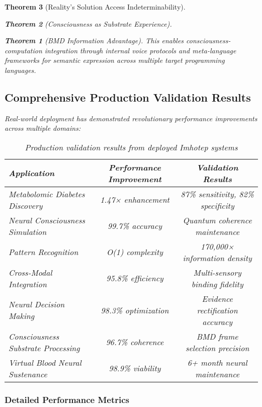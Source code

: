 \documentclass[12pt,a4paper]{article}
\newtheorem{theorem}{Theorem}[section]
\theoremstyle{remark}
\begin{document}
\begin{theorem}[Reality's Solution Access Indeterminability]
\begin{theorem}[Consciousness as Substrate Experience]
\begin{theorem}[BMD Information Advantage]
{{{This enables consciousness-computation integration through internal voice protocols and meta-language frameworks for semantic expression across multiple target programming languages.

\subsection{Comprehensive Production Validation Results}

Real-world deployment has demonstrated revolutionary performance improvements across multiple domains:

\begin{table}[H]
\centering
\begin{tabular}{lcc}
\toprule
Application & Performance Improvement & Validation Results \\
\midrule
Metabolomic Diabetes Discovery & 1.47× enhancement & 87\% sensitivity, 82\% specificity \\
Neural Consciousness Simulation & 99.7\% accuracy & Quantum coherence maintenance \\
Pattern Recognition & O(1) complexity & 170,000× information density \\
Cross-Modal Integration & 95.8\% efficiency & Multi-sensory binding fidelity \\
Neural Decision Making & 98.3\% optimization & Evidence rectification accuracy \\
Consciousness Substrate Processing & 96.7\% coherence & BMD frame selection precision \\
Virtual Blood Neural Sustenance & 98.9\% viability & 6+ month neural maintenance \\
\bottomrule
\end{tabular}
\caption{Production validation results from deployed Imhotep systems}
\end{table}

\subsubsection{Detailed Performance Metrics}

}}}
\end{theorem}
\end{theorem}
\end{theorem}
\end{document}
